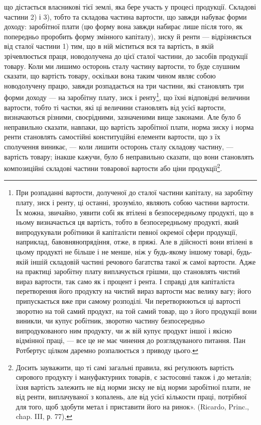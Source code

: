 що дістається власникові тієї землі, яка бере участь у процесі продукції. Складові
частини 2) і 3), тобто та складова частина вартости, що завжди набуває
форми доходу: заробітної плати (цю форму вона завжди набирає лише після
того, як попередньо проробить форму змінного капіталу), зиску й ренти —
відрізняється від сталої частини 1) тим, що в ній міститься вся та вартість, в
якій зрічевлюється праця, новодолучена до цієї сталої частини, до засобів продукції
товару. Коли ми лишимо осторонь сталу частину вартости, то буде слушним
сказати, що вартість товару, оскільки вона таким чином являє собою новодолучену
працю, завжди розпадається на три частини, які становлять три форми
доходу — на заробітну плату, зиск і ренту\footnote{
При розпаданні вартости, долученої до сталої частини капіталу, на заробітну плату, зиск і ренту,
ці останні, зрозуміло, являють собою частини вартости. Їх можна, звичайно, уявити собі як втілені в
безпосередньому продукті, що в ньому визначається ця вартість, тобто в безпосередньому продукті,
який випродукували робітники й капіталісти певної окремої сфери продукції, наприклад,
бавовнянопрядіння, отже, в пряжі. Але в дійсності вони втілені в цьому продукті не більше і не
менше, ніж у будь-якому іншому товарі, будь-якій іншій складовій частині речового багатства такої ж
самої вартости. Адже на практиці заробітну плату виплачується грішми, що становлять чистий вираз
вартости, так само як і процент і рента. І справді для капіталіста перетворення його продукту на
чистий вираз вартости має велику вагу; його припускається вже при самому розподілі. Чи
перетворюються ці вартості зворотно на той самий продукт, на той самий товар, що з його продукції
вони виникли, чи купує
робітник, зворотно частину безпосередньо випродукованого ним продукту, чи ж вій купує продукт іншої
і якісно відмінної праці, — все це не має чинення до розглядуваного питання. Пан Ротбертус цілком
даремно розпалюється з приводу цього.
}, що їхні відповідні величини вартости,
тобто ті частки, які ці величини становлять від усієї вартости, визначаються
різними, своєрідними, зазначеними вище законами. Але було б неправильно
сказати, навпаки, що вартість заробітної плати, норма зиску і норма ренти
становлять самостійні конституційні елементи вартости, що з їх сполучення виникає,
— коли лишити осторонь сталу складову частину, — вартість товару; інакше
кажучи, було б неправильно сказати, що вони становлять композиційні складові
частини товарової вартости або ціни продукції\footnote{
Досить зауважити, що ті самі загальні правила, які реґулюють вартість сирового продукту і
мануфактурних товарів, є застосовні також і до металів; їхня вартість залежить не від норми зиску не
від норми заробітної плати, не від ренти, виплачуваної з копалень, але від усієї кількости праці,
потрібної для того, щоб здобути метал і приставити його на ринок». (Ricardo, Princ., chap. III, р.
77),
}.

